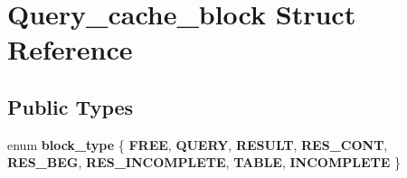 \hypertarget{structQuery__cache__block}{}\section{Query\+\_\+cache\+\_\+block Struct Reference}
\label{structQuery__cache__block}
\subsection*{Public Types}
\begin{DoxyCompactItemize}
\item 
\mbox{\label{structQuery__cache__block_a6d64f172277ff92f52779a91e1b9f9e3}} 
enum {\bfseries block\+\_\+type} \{ \newline
{\bfseries F\+R\+EE}, 
{\bfseries Q\+U\+E\+RY}, 
{\bfseries R\+E\+S\+U\+LT}, 
{\bfseries R\+E\+S\+\_\+\+C\+O\+NT}, 
\newline
{\bfseries R\+E\+S\+\_\+\+B\+EG}, 
{\bfseries R\+E\+S\+\_\+\+I\+N\+C\+O\+M\+P\+L\+E\+TE}, 
{\bfseries T\+A\+B\+LE}, 
{\bfseries I\+N\+C\+O\+M\+P\+L\+E\+TE}
 \}
\end{DoxyCompactItemize}

